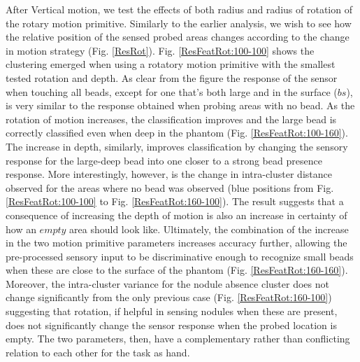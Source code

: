 \documentclass[]{interact}
\theoremstyle{plain}%
\theoremstyle{definition}
\theoremstyle{remark}
\begin{document}
After Vertical motion, we test the effects of both radius and radius of rotation of the rotary motion primitive. Similarly to the earlier analysis, we wish to see how the relative position of the sensed probed areas changes according to the change in motion strategy (Fig. \ref{ResRot}).  Fig. \ref{ResFeatRot:100-100} shows the clustering emerged when using a rotatory motion primitive with the smallest tested rotation and depth. As clear from the figure the response of the sensor when touching all beads, except for one that's both large and in the surface ($bs$), is very similar to the response obtained when probing areas with no bead. As the rotation of motion increases, the classification  improves and the large bead is correctly classified even when deep in the phantom (Fig. \ref{ResFeatRot:100-160}). The increase in depth, similarly, improves classification by changing the sensory response for the large-deep bead into one closer to a strong bead presence response. More interestingly, however, is the change in intra-cluster distance observed for the areas where no bead was observed (blue positions from Fig. \ref{ResFeatRot:100-100} to Fig. \ref{ResFeatRot:160-100}). The result suggests that a consequence of increasing the depth of motion is also an increase in certainty of how an $empty$ area should look like. Ultimately, the combination of the increase in the two motion primitive parameters increases accuracy further, allowing the pre-processed sensory input to be discriminative enough to recognize small beads when these are close to the surface of the phantom (Fig. \ref{ResFeatRot:160-160}). Moreover, the intra-cluster variance for the nodule absence cluster does not change significantly from the only previous case (Fig. \ref{ResFeatRot:160-100}) suggesting that rotation, if helpful in sensing nodules when these are present, does not significantly change the sensor response when the probed location is empty. The two parameters, then, have a complementary rather than conflicting relation to each other for the task as hand. 
\end{document}
